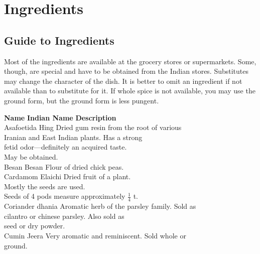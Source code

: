 \chapter{Ingredients}
\section{Guide to Ingredients}

Most of the ingredients are available at the grocery stores or
supermarkets. Some, though, are special and have to be obtained from
the Indian stores.
Substitutes may change the character of the dish. It is better to
omit an ingredient if not available than to substitute for it.
If whole spice is not available, you may use the ground form, but the
ground form is less pungent.

\begin{tabbing}
\={\bf Name}   \hspace{2.0cm} \={\bf Indian Name} \hspace{2.0cm} \={\bf
Description}\\

\> Asafoetida   \> Hing \> Dried gum resin from the root of various\\
\>              \>      \> Iranian and East Indian plants.  Has a strong \\
\>              \>      \> fetid odor---definitely an acquired taste.\\
\>              \>      \> May be obtained.\\

\> Besan        \> Besan        \> Flour of dried chick peas.\\

\> Cardamom     \> Elaichi\> Dried fruit of a plant. \\
\>              \>      \> Mostly the seeds are used.\\
\>              \>      \> Seeds of 4 pods measure approximately $\frac{1}{4}$ t.\\
                
\> Coriander    \> dhania\> Aromatic herb of the parsley family. Sold as\\
\>              \>      \> cilantro or chinese parsley.  Also sold as\\
\>              \>      \> seed or dry powder.\\

\> Cumin        \> Jeera\> Very aromatic and reminiscent. Sold whole or\\
\>              \>      \> ground.\\


\end{tabbing}
